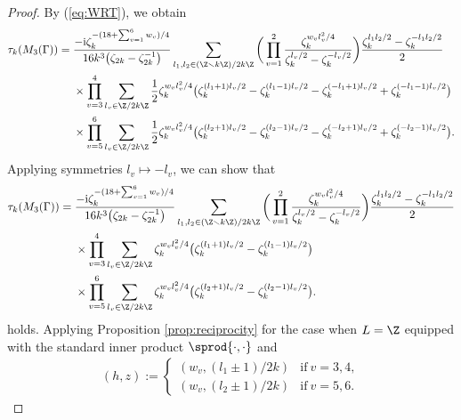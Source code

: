 \begin{proof}
	By (\ref{eq:WRT}), we obtain
	\begin{align*}
		\tau_{k}(M_3(\Gamma))
		= {}
		&\frac{-{\rm i} \zeta_{k}^{-(18 + \sum_{v=1}^{6}w_{v})/4}}{16k^{3} \big(\zeta_{2k}-\zeta_{2k}^{-1}\big)}
		\sum_{l_{1}, l_{2} \in (\Z \smallsetminus k\Z) / 2k\Z}
		\bigg( \prod_{v=1}^{2} \frac{\zeta_{k}^{w_{v}l_{v}^{2}/4}}{\zeta_{k}^{l_{v}/2} - \zeta_{k}^{-l_{v}/2}} \bigg) \frac{\zeta_{k}^{l_{1}l_{2}/2} - \zeta_{k}^{-l_{1}l_{2}/2}}{2}
\\
		&\times \prod_{v=3}^{4} \sum_{l_{v} \in \Z / 2k\Z} \frac{1}{2} \zeta_{k}^{w_{v}l_{v}^{2}/4} \big( \zeta_{k}^{(l_{1} + 1)l_{v}/2} - \zeta_{k}^{(l_{1} - 1)l_{v}/2} - \zeta_{k}^{(-l_{1} + 1)l_{v}/2 } + \zeta_{k}^{(-l_{1} - 1)l_{v}/2} \big) \\
		&\times \prod_{v=5}^{6} \sum_{l_{v} \in \Z / 2k\Z} \frac{1}{2} \zeta_{k}^{w_{v}l_{v}^{2}/4} \big( \zeta_{k}^{(l_{2} + 1)l_{v}/2} - \zeta_{k}^{(l_{2} - 1)l_{v}/2} - \zeta_{k}^{(-l_{2} + 1)l_{v}/2 } + \zeta_{k}^{(-l_{2} - 1)l_{v}/2} \big).
	\end{align*}
	Applying symmetries $l_{v} \mapsto - l_{v}$, we can show that\vspace{-1ex}
	\begin{align*}
		\tau_{k}(M_3(\Gamma)) = {}
		&\frac{-{\rm i} \zeta_{k}^{-(18 + \sum_{v=1}^{6}w_{v})/4}}{16k^{3} \big(\zeta_{2k}-\zeta_{2k}^{-1}\big)}
		\sum_{l_{1}, l_{2} \in (\Z \smallsetminus k\Z) / 2k\Z}
		\bigg( \prod_{v=1}^{2} \frac{\zeta_{k}^{w_{v}l_{v}^{2}/4}}{\zeta_{k}^{l_{v}/2} - \zeta_{k}^{-l_{v}/2}} \bigg) \frac{\zeta_{k}^{l_{1}l_{2}/2} - \zeta_{k}^{-l_{1}l_{2}/2}}{2}
\\
		&\times \prod_{v=3}^{4} \sum_{l_{v} \in \Z / 2k\Z} \zeta_{k}^{w_{v}l_{v}^{2}/4} \big( \zeta_{k}^{(l_{1} + 1)l_{v}/2} - \zeta_{k}^{(l_{1} - 1)l_{v}/2} \big)
\\
		&\times \prod_{v=5}^{6} \sum_{l_{v} \in \Z / 2k\Z} \zeta_{k}^{w_{v}l_{v}^{2}/4} \big( \zeta_{k}^{(l_{2} + 1)l_{v}/2} - \zeta_{k}^{(l_{2} - 1)l_{v}/2} \big).
	\end{align*}
	holds.
	Applying Proposition \ref{prop:reciprocity} for the case when $ L = \Z $ equipped with the standard inner product $ \sprod{\cdot, \cdot} $ and\vspace{-1ex}
	\begin{gather*}
	(h, z) :=
	\begin{cases}
		(w_{v}, (l_{1} \pm 1)/2k) & \text{if} \ v = 3, 4,
\\
		(w_{v}, (l_{2} \pm 1)/2k) & \text{if} \ v = 5, 6.

\end{cases}
\end{gather*}
\end{proof}
